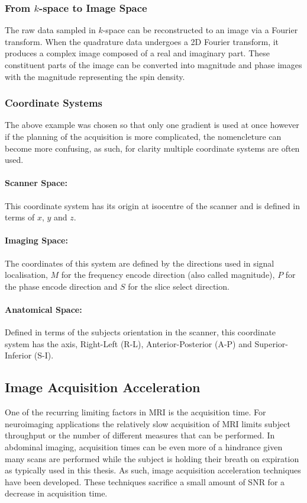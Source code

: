 \subsubsection{From $k$-space to Image Space}

The raw data sampled in $k$-space can be reconstructed to an image via a Fourier transform. When the quadrature data undergoes a 2D Fourier transform, it produces a complex image composed of a real and imaginary part. These constituent parts of the image can be converted into magnitude and phase images with the magnitude representing the spin density.

\subsubsection{Coordinate Systems}
The above example was chosen so that only one gradient is used at once however if the planning of the acquisition is more complicated, the nomencleture can become more confusing, as such, for clarity multiple coordinate systems are often used.
\paragraph{Scanner Space:}
This coordinate system has its origin at isocentre of the scanner and is defined in terms of $x$, $y$ and $z$.
\paragraph{Imaging Space:}
The coordinates of this system are defined by the directions used in signal localisation, $M$ for the frequency encode direction (also called magnitude), $P$ for the phase encode direction and $S$ for the slice select direction.
\paragraph{Anatomical Space:}
Defined in terms of the subjects orientation in the scanner, this coordinate system has the axis, Right-Left (R-L), Anterior-Posterior (A-P) and Superior-Inferior (S-I).

\subsection{Image Acquisition Acceleration}
One of the recurring limiting factors in \ac{MRI} is the acquisition time. For neuroimaging applications the relatively slow acquisition of \ac{MRI} limits subject throughput or the number of different measures that can be performed. In abdominal imaging, acquisition times can be even more of a hindrance given many scans are performed while the subject is holding their breath on expiration as typically used in this thesis. As such, image acquisition acceleration techniques have been developed. These techniques sacrifice a small amount of \ac{SNR} for a decrease in acquisition time.

